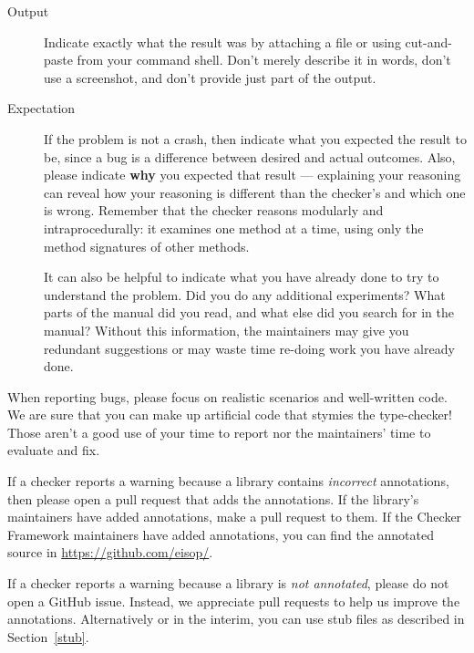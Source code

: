 \begin{description}
\item[Output]
  Indicate exactly what the result was by attaching a file or using
  cut-and-paste from your command shell.  Don't merely describe it in
  words, don't use a screenshot, and don't provide just part of the output.

\item[Expectation]
  If the problem is not a crash, then
  indicate what you expected the result to be, since a bug is a difference
  between desired and actual outcomes.  Also, please indicate \textbf{why}
  you expected that result --- explaining your reasoning can reveal
  how your reasoning is different than the checker's and which
  one is wrong.  Remember that the checker reasons modularly and
  intraprocedurally:  it examines one method at a time, using only the
  method signatures of other methods.

  It can also be helpful to indicate what you have already done to try to
  understand the problem.  Did you do any additional experiments?  What
  parts of the manual did you read, and what else did you search for in the
  manual?  Without this information, the maintainers may give you redundant
  suggestions or may waste time re-doing work you have already done.
\end{description}


When reporting bugs, please focus on realistic scenarios and well-written
code.  We are sure that you can make up artificial code that stymies the
type-checker!  Those aren't a good use of your time to report nor the
maintainers' time to evaluate and fix.



If a checker reports a warning because a library contains \emph{incorrect} annotations,
then please open a pull request that adds the annotations.  If the
library's maintainers have added annotations, make a pull request to them.
If the Checker Framework maintainers have added annotations,
you can find the annotated source in \url{https://github.com/eisop/}.

If a checker reports a warning because a library is \emph{not
annotated}, please do not open a GitHub issue.
Instead, we appreciate pull requests to help us improve the annotations.
Alternatively or in the interim, you can use stub files as described in
Section~\ref{stub}.

